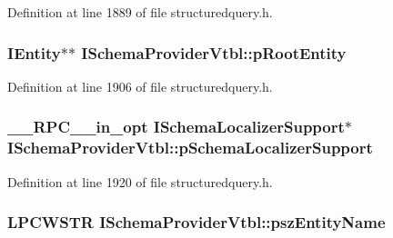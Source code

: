 Definition at line 1889 of file structuredquery.\+h.

\subsubsection[{\texorpdfstring{p\+Root\+Entity}{pRootEntity}}]{ {\bf I\+Entity}$\ast$$\ast$ I\+Schema\+Provider\+Vtbl\+::p\+Root\+Entity}\hypertarget{struct_i_schema_provider_vtbl_aeb31f39a96c1c0f2d585029bfcabf9bd}{}\label{struct_i_schema_provider_vtbl_aeb31f39a96c1c0f2d585029bfcabf9bd}


Definition at line 1906 of file structuredquery.\+h.

\subsubsection[{\texorpdfstring{p\+Schema\+Localizer\+Support}{pSchemaLocalizerSupport}}]{ {\bf \+\_\+\+\_\+\+R\+P\+C\+\_\+\+\_\+in\+\_\+opt} {\bf I\+Schema\+Localizer\+Support}$\ast$ I\+Schema\+Provider\+Vtbl\+::p\+Schema\+Localizer\+Support}\hypertarget{struct_i_schema_provider_vtbl_ae94697db893056681e76581a8650875d}{}\label{struct_i_schema_provider_vtbl_ae94697db893056681e76581a8650875d}


Definition at line 1920 of file structuredquery.\+h.

\subsubsection[{\texorpdfstring{psz\+Entity\+Name}{pszEntityName}}]{ {\bf L\+P\+C\+W\+S\+TR} I\+Schema\+Provider\+Vtbl\+::psz\+Entity\+Name}\hypertarget{struct_i_schema_provider_vtbl_a25a13eed002aebcaa5378479f185e2c9}{}\label{struct_i_schema_provider_vtbl_a25a13eed002aebcaa5378479f185e2c9}


